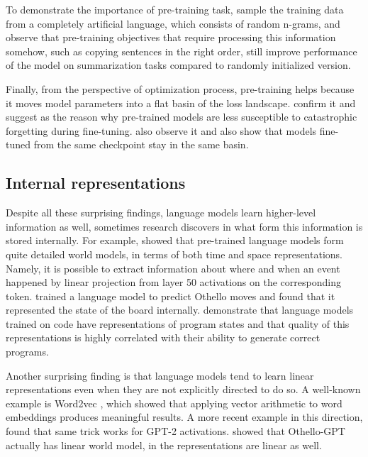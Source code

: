 \documentclass[a4paper, 11pt, oneside]{article}
\begin{document}
	To demonstrate the importance of pre-training task, \citet{krishna2021does} sample
	the training data from a completely artificial language, which consists of
	random n-grams, and observe that pre-training objectives that require processing
	this information somehow, such as copying sentences in the right order, still improve
	performance of the model on summarization tasks compared to randomly initialized
	version.

	Finally, from the perspective of optimization process, pre-training helps because
	it moves model parameters into a flat basin of the loss landscape. \citet{mehta2021empirical}
	confirm it and suggest as the reason why pre-trained models are less susceptible
	to catastrophic forgetting during fine-tuning. \citet{neyshabur2020being} also
	observe it and also show that models fine-tuned from the same checkpoint stay in
	the same basin.

	\subsection{Internal representations}

	Despite all these surprising findings, language models learn higher-level information
	as well, sometimes research discovers in what form this information is stored
	internally. For example, \citet{gurnee2023language} showed that pre-trained language
	models form quite detailed world models, in terms of both time and space
	representations. Namely, it is possible to extract information about where and
	when an event happened by linear projection from layer 50 activations on the
	corresponding token. \citet{li2022emergent} trained a language model to
	predict Othello moves and found that it represented the state of the board
	internally. \citet{jin2023evidence} demonstrate that language models trained
	on code have representations of program states and that quality of this
	representations is highly correlated with their ability to generate correct
	programs.

	Another surprising finding is that language models tend to learn linear
	representations even when they are not explicitly directed to do so. A well-known
	example is Word2vec \cite{mikolov2013efficient}, which showed that applying
	vector arithmetic to word embeddings produces meaningful results. A more recent
	example in this direction, \citet{turner2023activation} found that same trick works
	for GPT-2 activations. \citet{nanda2023othello} showed that Othello-GPT actually
	has linear world model, in \cite{jin2023evidence} the representations are
	linear as well.
\end{document}
